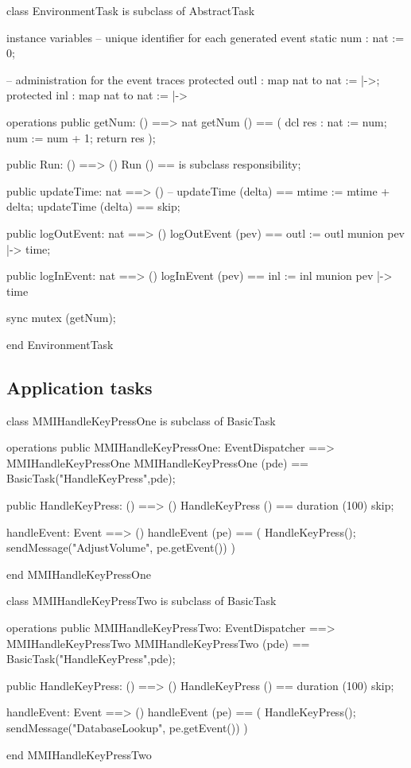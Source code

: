 \begin{vdm_al}
class EnvironmentTask
  is subclass of AbstractTask

instance variables
  -- unique identifier for each generated event
  static num : nat := 0;

  -- administration for the event traces
  protected outl : map nat to nat := {|->};
  protected inl : map nat to nat := {|->}

operations
  public getNum: () ==> nat
  getNum () ==
    ( dcl res : nat := num;
      num := num + 1;
      return res );

  public Run: () ==> ()
  Run () == is subclass responsibility;

  public updateTime: nat ==> ()
  -- updateTime (delta) == mtime := mtime + delta;
  updateTime (delta) == skip;

  public logOutEvent: nat ==> ()
  logOutEvent (pev) == outl := outl munion {pev |-> time};

  public logInEvent: nat ==> ()
  logInEvent (pev) == inl := inl munion {pev |-> time}

sync
  mutex (getNum);

end EnvironmentTask
\end{vdm_al}

\subsection{Application tasks}

\begin{vdm_al}
class MMIHandleKeyPressOne
  is subclass of BasicTask

operations
  public MMIHandleKeyPressOne: EventDispatcher ==> MMIHandleKeyPressOne
  MMIHandleKeyPressOne (pde) ==  BasicTask("HandleKeyPress",pde);

  public HandleKeyPress: () ==> ()
  HandleKeyPress () == duration (100) skip;

  handleEvent: Event ==> ()
  handleEvent (pe) ==
    ( HandleKeyPress();
      sendMessage("AdjustVolume", pe.getEvent()) )

end MMIHandleKeyPressOne
\end{vdm_al}

\begin{vdm_al}
class MMIHandleKeyPressTwo
  is subclass of BasicTask

operations
  public MMIHandleKeyPressTwo: EventDispatcher ==> MMIHandleKeyPressTwo
  MMIHandleKeyPressTwo (pde) == BasicTask("HandleKeyPress",pde);

  public HandleKeyPress: () ==> ()
  HandleKeyPress () == duration (100) skip;

  handleEvent: Event ==> ()
  handleEvent (pe) ==
    ( HandleKeyPress();
      sendMessage("DatabaseLookup", pe.getEvent()) )

end MMIHandleKeyPressTwo
\end{vdm_al}

